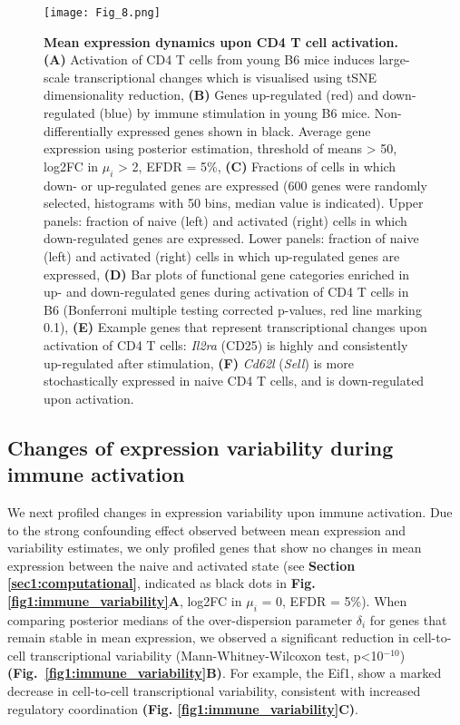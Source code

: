 \begin{figure}[!ht]
\centering
\texttt{[image: Fig\_8.png]}
\caption[Mean expression dynamics upon CD4\plus{} T cell activation]{\textbf{Mean expression dynamics upon CD4\plus{} T cell activation.}\\
\textbf{(A)} Activation of CD4\plus{} T cells from young B6 mice induces large-scale transcriptional changes which is visualised using tSNE dimensionality reduction, 
\textbf{(B)} Genes up-regulated (red) and down-regulated (blue) by immune stimulation in young B6 mice. Non-differentially expressed genes shown in black. Average gene expression using posterior estimation, threshold of means > 50, log2FC in $\mu_i$ > 2, EFDR = 5\%, 
\textbf{(C)} Fractions of cells in which down- or up-regulated genes are expressed (600 genes were randomly selected, histograms with 50 bins, median value is indicated). 
Upper panels: fraction of naive (left) and activated (right) cells in which down-regulated genes are expressed. Lower panels: fraction of naive (left) and activated (right) cells in which up-regulated genes are expressed, 
\textbf{(D)} Bar plots of functional gene categories enriched in up- and down-regulated genes during activation of CD4\plus{} T cells in B6 (Bonferroni multiple testing corrected p-values, red line marking 0.1), 
\textbf{(E)} Example genes that represent transcriptional changes upon activation of CD4\plus{} T cells: \textit{Il2ra} (CD25) is highly and consistently up-regulated after stimulation, 
\textbf{(F)} \textit{Cd62l} (\textit{Sell}) is more stochastically expressed in naive CD4\plus{} T cells, and is down-regulated upon activation.
}
\label{fig1:immune_activation}
\end{figure}

\newpage

\subsection{Changes of expression variability during immune activation}

We next profiled changes in expression variability upon immune activation. 
Due to the strong confounding effect observed between mean expression and variability estimates, we only profiled genes that show no changes in mean expression between the naive and activated state (see \textbf{Section \ref{sec1:computational}}, indicated as black dots in \textbf{Fig. \ref{fig1:immune_variability}A}, log2FC in $\mu_i$ = 0, EFDR = 5\%). 
When comparing posterior medians of the over-dispersion parameter $\delta_i$ for genes that remain stable in mean expression, we observed a significant reduction in cell-to-cell transcriptional variability (Mann-Whitney-Wilcoxon test, p<10$^{-10}$) \textbf{(Fig.~\ref{fig1:immune_variability}B)}. 
For example, the \gls{Eif1}, show a marked decrease in cell-to-cell transcriptional variability, consistent with increased regulatory coordination \textbf{(Fig. \ref{fig1:immune_variability}C)}.\\

